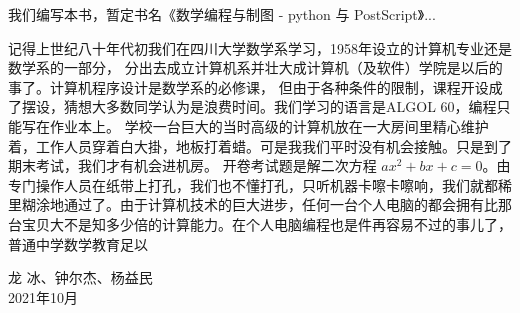 \documentclass[main.tex]{subfiles}
\begin{document}
我们编写本书，暂定书名《数学编程与制图 - python 与 PostScript》...

记得上世纪八十年代初我们在四川大学数学系学习，1958年设立的计算机专业还是数学系的一部分，
分出去成立计算机系并壮大成计算机（及软件）学院是以后的事了。计算机程序设计是数学系的必修课，
但由于各种条件的限制，课程开设成了摆设，猜想大多数同学认为是浪费时间。我们学习的语言是ALGOL 60，编程只能写在作业本上。
学校一台巨大的当时高级的计算机放在一大房间里精心维护着，工作人员穿着白大掛，地板打着蜡。可是我我们平时没有机会接触。只是到了期末考试，我们才有机会进机房。
开卷考试题是解二次方程 $ax^2+bx+c = 0$。由专门操作人员在纸带上打孔，我们也不懂打孔，只听机器卡嚓卡嚓响，我们就都稀里糊涂地通过了。由于计算机技术的巨大进步，任何一台个人电脑的都会拥有比那台宝贝大不是知多少倍的计算能力。在个人电脑编程也是件再容易不过的事儿了，普通中学数学教育足以

\begin{flushright}
龙 冰、钟尔杰、杨益民\\
2021年10月
\end{flushright}
\end{document}
